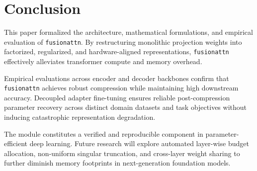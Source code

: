 \section{Conclusion}
This paper formalized the architecture, mathematical formulations, and empirical evaluation of \texttt{fusionattn}. By restructuring monolithic projection weights into factorized, regularized, and hardware-aligned representations, \texttt{fusionattn} effectively alleviates transformer compute and memory overhead.

Empirical evaluations across encoder and decoder backbones confirm that \texttt{fusionattn} achieves robust compression while maintaining high downstream accuracy. Decoupled adapter fine-tuning ensures reliable post-compression parameter recovery across distinct domain datasets and task objectives without inducing catastrophic representation degradation.

The module constitutes a verified and reproducible component in parameter-efficient deep learning. Future research will explore automated layer-wise budget allocation, non-uniform singular truncation, and cross-layer weight sharing to further diminish memory footprints in next-generation foundation models.

